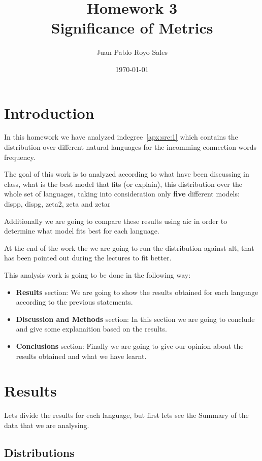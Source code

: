 \documentclass[12pt, a4paper]{article}
\title{%
      Homework 3\\
      Significance of Metrics\\
}
\author{Juan Pablo Royo Sales}
\affil{Universitat Politècnica de Catalunya}
\date\today
\begin{document}
\maketitle

\tableofcontents

\section{Introduction}
In this homework we have analyzed \acrfull{indegree}~\ref{apx:src:1} which contains the distribution over different natural languages for the incomming connection words frequency.

The goal of this work is to analyzed according to what have been discussing in class, what is the best model that fits (or explain), this distribution over the whole set of languages, taking into consideration
only \textbf{five} different models: \acrfull{dispp}, \acrfull{dispg}, \acrfull{zeta2}, \acrfull{zeta} and \acrfull{zetar}

Additionally we are going to compare these results using \acrfull{aic} in order to determine what model fits best for each language. 

At the end of the work the we are going to run the distribution against \acrfull{alt}, that has been pointed out during the lectures to fit better. 

This analysis work is going to be done in the following way:

\begin{itemize}
    \item \textbf{Results} section: We are going to show the results obtained for each language according to the previous statements.
    \item \textbf{Discussion and Methods} section: In this section we are going to conclude and give some explanaition based on the results.
    \item \textbf{Conclusions} section: Finally we are going to give our opinion about the results obtained and what we have learnt.
\end{itemize}

\section{Results}
Lets divide the results for each language, but first lets see the Summary of the data that we are analysing.

\subsection{Distributions}
\end{document}
